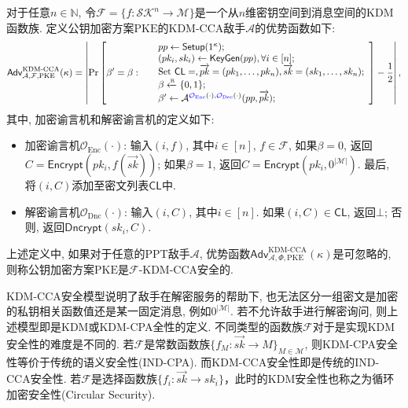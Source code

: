 \begin{definition} 
对于任意$n \in \mathbb{N}$, 令$\mathcal{F} = \{f: \mathcal{SK}^n \rightarrow \mathcal{M}\}$是一个从$n$维密钥空间到消息空间的KDM函数族. 定义公钥加密方案$\text{PKE}$的KDM-CCA敌手$\mathcal{A}$的优势函数如下: 
\begin{displaymath}
	\mathsf{Adv}_{\mathcal{A}, \mathcal{F}, \text{PKE}}^{\text{KDM-CCA}}(\kappa) = \left| \Pr \left[ \beta' = \beta:~
	\begin{array}{ll}
		& pp \leftarrow \mathsf{Setup}(1^\kappa); \\		
		& (pk_i, sk_i) \leftarrow \mathsf{KeyGen}(pp), \forall i \in [n];\\
		& \text{Set } \mathsf{CL} = \empty, \overrightarrow{pk} = (pk_1, \ldots, pk_n), \overrightarrow{sk} = (sk_1, \ldots, sk_n); \\
		& \beta \sample \{0,1\};\\ 
		& \beta' \leftarrow \mathcal{A}^{\blue{\mathcal{O}_{\text{Enc}}}(\cdot), \blue{\mathcal{O}_{\text{Dec}}}(\cdot)}(pp, \overrightarrow{pk});
	\end{array} 
\right] - \frac{1}{2} \right|,
\end{displaymath}
其中, 加密谕言机和解密谕言机的定义如下:
\begin{itemize}
\item 加密谕言机$\mathcal{O}_{\text{Enc}}(\cdot)$: 输入$(i, f)$, 其中$i \in [n]$, $f \in \mathcal{F}$, 如果$\beta = 0$, 返回$C=\mathsf{Encrypt}(pk_i, f(\overrightarrow{sk}))$; 如果$\beta = 1$, 返回$C=\mathsf{Encrypt}(pk_i, 0^{|\mathcal{M}|})$. 最后, 将$(i, C)$添加至密文列表$\mathsf{CL}$中.

\item 解密谕言机$\mathcal{O}_{\text{Dnc}}(\cdot)$: 输入$(i, C)$, 其中$i \in [n]$. 如果$(i, C) \in \mathsf{CL}$, 返回$\bot$; 否则, 返回$\mathsf{Dncrypt}(sk_i, C)$.
\end{itemize}

上述定义中, 如果对于任意的PPT敌手$\mathcal{A}$, 优势函数$\mathsf{Adv}_{\mathcal{A}, \Phi, \text{PKE}}^{\text{KDM-CCA}}(\kappa)$是可忽略的, 则称公钥加密方案$\text{PKE}$是$\mathcal{F}$-KDM-CCA安全的.
\end{definition}

\begin{note}
KDM-CCA安全模型说明了敌手在解密服务的帮助下, 也无法区分一组密文是加密的私钥相关函数值还是某一固定消息, 例如$0^{|\mathcal{M}|}$. 若不允许敌手进行解密询问, 则上述模型即是KDM或KDM-CPA全性的定义. 不同类型的函数族$\mathcal{F}$对于是实现KDM安全性的难度是不同的. 若$\mathcal{F}$是常数函数族$\{f_M: \overrightarrow{sk} \rightarrow M\}_{M\in\mathcal{M}}$, 则KDM-CPA安全性等价于传统的语义安全性(IND-CPA). 而KDM-CCA安全性即是传统的IND-CCA安全性. 若$\mathcal{F}$是选择函数族$\{f_i:\overrightarrow{sk} \rightarrow sk_i \}$，此时的KDM安全性也称之为循环加密安全性(Circular Security).
\end{note}

